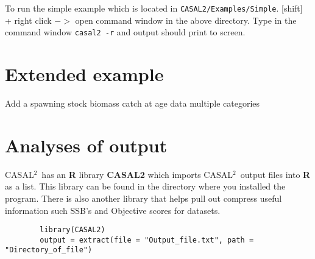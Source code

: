 \documentclass[12pt]{article}
\newcommand{\CAS}{CASAL$^2$}
\begin{document}
To run the simple example which is located in \texttt{CASAL2/Examples/Simple}. [shift] + right click $->$ open command window in the above directory. Type in the command window \texttt{casal2 -r} and output should print to screen.

\section{Extended example}\label{Sec:exte}
Add a spawning stock biomass
catch at age data
multiple categories

\section{Analyses of output}\label{Sec:output}
\CAS\ has an \textbf{R} library \textbf{CASAL2} which imports \CAS\ output files into \textbf{R} as a list. This library can be found in the directory where you installed the program. There is also another library that helps pull out compress useful information such SSB's and Objective scores for datasets. 
{\small{\begin{verbatim}
		library(CASAL2)
		output = extract(file = "Output_file.txt", path = "Directory_of_file")
		\end{verbatim}}}
\end{document}
